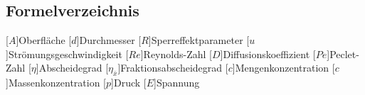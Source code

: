 \begin{acronym}
\section{Formelverzeichnis}
[\ensuremath{A}]{Oberfläche}
[\ensuremath{d}]{\acrounit{\meter}Durchmesser}
[\ensuremath{R}]{Sperreffektparameter}
[\ensuremath{u}]{\acrounit{\metre\per\second}Strömungsgeschwindigkeit}
[\ensuremath{Re}]{Reynolds-Zahl}
[\ensuremath{D}]{\acrounit{\meter^2\per\second}Diffusionskoeffizient}
[\ensuremath{Pe}]{Peclet-Zahl}
[\ensuremath{\eta}]{Abscheidegrad}
[\ensuremath{\eta_{\bar x}}]{Fraktionsabscheidegrad}
[\ensuremath{c}]{\acrounit{1\per\liter}Mengenkonzentration}
[\ensuremath{c}]{Massenkonzentration}
[\ensuremath{p}]{Druck}
[\ensuremath{E}]{Spannung}
\end{acronym}


	
